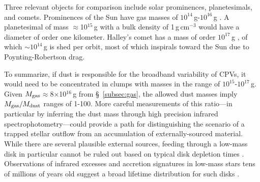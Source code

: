 \documentclass{nature3}
\begin{document}
\begin{methods}
Three relevant objects for comparison include solar
prominences, planetesimals, and comets.  Prominences of the Sun have
gas masses of $10^{14}$\,g-$10^{16}$\,g \cite{VialEngvold2015}.
A planetesimal of mass $\approx$10$^{15}$\,g with a bulk density of
1\,g\,cm$^{-3}$ would have a diameter of order one kilometer.
Halley's comet has a mass of order $10^{17}$\,g \cite{Rickman1989}, of
which $\sim$$10^{14}$\,g is shed per orbit, most of which inspirals
toward the Sun due to Poynting-Robertson drag.

To summarize, if dust is responsible for
the broadband variability of CPVs, it would need to be concentrated in
clumps with masses in the range of $10^{15}$-$10^{17}$\,g.  Given
$M_{\rm gas}$$\approx$8$\times$10$^{16}$\,g from
\S~\ref{subsec:gas}, the allowed dust masses imply $M_{\rm
gas}/M_{\rm dust}$ ranges of 1-100.  More careful measurements of this
ratio---in particular by inferring the dust mass through high
precision infrared spectrophotometry---could provide a path for
distinguishing the scenario of a trapped stellar outflow from an
accumulation of externally-sourced material.  While there are several
plausible external sources, feeding through a low-mass disk in
particular cannot be ruled out based on typical disk depletion times
\cite{Haisch2001}.  Observations of infrared excesses and accretion
signatures in low-mass stars tens of millions of years old suggest a
broad lifetime distribution for such disks
\cite{Silverberg2020,Lee2020,Gaidos2022,Pfalzner2024}.




\end{methods}
\end{document}
